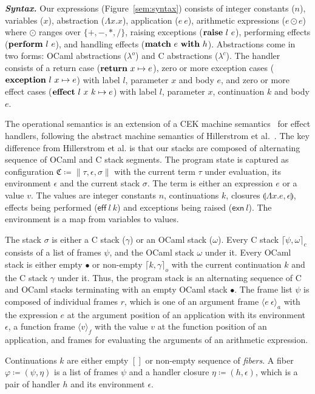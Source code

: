 \documentclass[sigplan,10pt,review,anonymous]{acmart}\settopmatter{printfolios=true,printccs=false,printacmref=false}
\newcommand{\lam}[2]{\Lambda #1. #2}
\newcommand{\env}{\epsilon}
\newcommand{\clos}[3]{\llparenthesis \lam{#1}{#2}, #3 \rrparenthesis}
\newcommand{\kw}[1]{\text{\bf #1}}
\newcommand{\effval}[2]{\textsf{eff} ~#1 ~#2}
\newcommand{\exnval}[1]{\textsf{exn} ~#1}
\newcommand{\handle}[2]{\kw{match} ~#1 ~\kw{with} ~#2}
\newcommand{\throw}[2]{\kw{raise} ~#1 ~#2}
\newcommand{\perform}[2]{\kw{perform} ~#1 ~#2}
\newcommand{\caseval}[2]{\kw{return}~#1 \mapsto #2}
\newcommand{\caseexn}[3]{\kw{exception} ~#1 ~#2 \mapsto #3}
\newcommand{\caseeff}[4]{\kw{effect} ~#1 ~#2 ~#3 \mapsto #4}
\newcommand{\farg}[2]{\langle #1 ~#2 \rangle_a}
\newcommand{\ffun}[1]{\langle #1 \rangle_f}
\newcommand{\fiber}{\varphi}
\newcommand{\fl}{\psi} %
\newcommand{\hc}{\eta} %
\newcommand{\cstack}{\gamma} %
\newcommand{\ostack}{\omega} %
\newcommand{\cstacka}[2]{\big \lceil #1, #2 \big \rceil_c} %
\newcommand{\ostacka}[2]{\big \lceil #1, #2 \big \rceil_o} %
\newcommand{\ostackemp}{\bullet}
\newcommand{\stack}{\sigma}
\newcommand{\config}{\mathfrak{C}}
\newcommand{\configa}[3]{\|#1,#2,#3\|}
\begin{document}
\textbf{\textit{Syntax.}} Our expressions (Figure~\ref{sem:syntax}) consists of
integer constants ($n$), variables ($x$), abstraction ($\lam{x}{x}$),
application ($e~e$), arithmetic expressions ($e \odot e$) where $\odot$ ranges
over $\{+,-,*,/\}$, raising exceptions ($\throw{l}{e}$), performing effects
($\perform{l}{e}$), and handling effects ($\handle{e}{h}$). Abstractions come
in two forms: OCaml abstractions ($\lambda^o$) and C abstractions
($\lambda^c$). The handler consists of a return case ($\caseval{x}{e}$), zero
or more exception cases ($\caseexn{l}{x}{e}$) with label $l$, parameter $x$ and
body $e$, and zero or more effect cases ($\caseeff{l}{x}{k}{e}$) with label
$l$, parameter $x$, continuation $k$ and body $e$.

The operational semantics is an extension of a CEK machine
semantics~\cite{Felleisen86} for effect handlers, following the abstract
machine semantics of Hillerstrom et al.~\cite{Hillerstrom20}. The key
difference from Hillerstrom et al. is that our stacks are composed of
alternating sequence of OCaml and C stack segments. The program state is
captured as configuration $\config \coloneqq \configa{\tau}{\env}{\stack}$ with
the current term $\tau$ under evaluation, its environment $\env$ and the
current stack $\stack$. The term is either an expression $e$ or a value $v$.
The values are integer constants $n$, continuations $k$, closures
$\clos{x}{e}{\env}$, effects being performed ($\effval{l}{k}$) and exceptions
being raised ($\exnval{l}$). The environment is a map from variables to values.

The stack $\stack$ is either a C stack ($\cstack$) or an OCaml stack
($\ostack$). Every C stack $\cstacka{\fl}{\ostack}$ consists of a list of
frames $\fl$, and the OCaml stack $\ostack$ under it. Every OCaml stack is
either empty $\ostackemp$ or non-empty $\ostacka{k}{\cstack}$ with the current
continuation $k$ and the C stack $\cstack$ under it. Thus, the program stack is
an alternating sequence of C and OCaml stacks terminating with an empty OCaml
stack $\ostackemp$. The frame list $\fl$ is composed of individual frames $r$,
which is one of an argument frame $\farg{e}{\env}$ with the expression $e$ at
the argument position of an application with its environment $\env$, a function
frame $\ffun{v}$ with the value $v$ at the function position of an application,
and frames for evaluating the arguments of an arithmetic expression.

Continuations $k$ are either empty $[]$ or non-empty sequence of \emph{fibers}.
A fiber $\fiber \coloneqq (\fl,\hc)$ is a list of frames $\fl$ and a handler
closure $\hc \coloneqq (h,\env)$, which is a pair of handler $h$ and its
environment $\env$.
\end{document}
